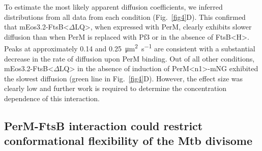 \documentclass[twocolumn,pdflatex,sn-nature]{sn-jnl}%
\def\textsuperscript#1{<#1>}%
\newcommand\mtb{Mtb}
\newcommand\ftsbH{FtsB\textsuperscript{H}}
\newcommand\ftsbdLQ{FtsB\textsuperscript{$\Delta{}$LQ}}
\newcommand\permN{PerM\textsuperscript{n1}}
\begin{document}

To estimate the most likely apparent diffusion coefficients, we inferred distributions from all data from each condition (Fig.~\ref{fig4}D).
This confirmed that mEos3.2-\ftsbdLQ{}, when expressed with PerM, clearly exhibits slower diffusion than when PerM is replaced with Pf3 or in the absence of \ftsbH{}.
Peaks at approximately 0.14 and \qty{0.25}{\square\um\per\s} are consistent with a substantial decrease in the rate of diffusion upon PerM binding.
Out of all other conditions, mEos3.2-\ftsbdLQ{} in the absence of induction of \permN{}-mNG exhibited the slowest diffusion (green line in Fig.~\ref{fig4}D).
However, the effect size was clearly low and further work is required to determine the concentration dependence of this interaction.

\subsection{PerM-FtsB interaction could restrict conformational flexibility of the \mtb{} divisome}
\end{document}
